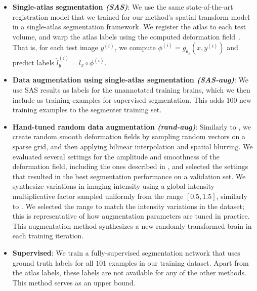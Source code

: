 \documentclass[10pt,twocolumn,letterpaper]{article}
\begin{document}
\begin{itemize}[leftmargin=-2pt]
\item[] \textbf{Single-atlas segmentation \textit{(SAS)}}: We use the same state-of-the-art registration model \cite{balakrishnan2018unsupervised} that we trained for our method's spatial transform model in a single-atlas segmentation framework. We register the atlas to each test volume, and warp the atlas labels using the computed deformation field~\cite{baillard2001segmentation,ciofolo2009atlas,dawant1999automatic,hellier2004hierarchical,klein2005mindboggle}. That is, for each test image $y^{(i)}$, we compute $\phi^{(i)} = g_{\theta_s}(x, y^{(i)})$ and predict labels $\hat l^{(i)}_{y} = l_x \circ \phi^{(i)}$. 

\item[] \textbf{Data augmentation using single-atlas segmentation \textit{(SAS-aug)}}: We use SAS results as labels for the unannotated training brains, which we then include as training examples for supervised segmentation. This adds $100$ new training examples to the segmenter training set. 


\item[] \textbf{Hand-tuned random data augmentation \textit{(rand-aug)}}: Similarly to \cite{milletari2016v,ronneberger2015u,roth2015anatomy}, we create random smooth deformation fields by sampling random vectors on a sparse grid, and then applying bilinear interpolation and spatial blurring. We evaluated several settings for the amplitude and smoothness of the deformation field, including the ones described in \cite{ronneberger2015u}, and selected the settings that resulted in the best segmentation performance on a validation set. We synthesize variations in imaging intensity using a global intensity multiplicative factor sampled uniformly from the range $[0.5, 1.5]$, similarly to \cite{hussain2017differential,kamnitsas2017efficient}. We selected the range to match the intensity variations in the dataset; this is representative of how augmentation parameters are tuned in practice. This augmentation method synthesizes a new randomly transformed brain in each training iteration.

\item[] \textbf{Supervised}: We train a fully-supervised segmentation network that uses ground truth labels for all $101$ examples in our training dataset. Apart from the atlas labels, these labels are not available for any of the other methods. This method serves as an upper bound.\\
\end{itemize}
\end{document}
